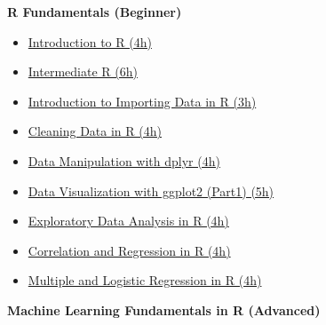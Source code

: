 \documentclass[
  11pt,
]{book}
\providecommand{\tightlist}{%
  \setlength{\itemsep}{0pt}\setlength{\parskip}{0pt}}
\newenvironment{tips}[1]
  {
  \begin{itemize}
  \footnotesize
  \renewcommand{\labelitemi}{
    \raisebox{-.7\height}[0pt][0pt]{
      {\setkeys{Gin}{width=3em,keepaspectratio}
        \texttt{[image: images/\#1.png]}}
    }
  }
  \setlength{\fboxsep}{1em}
  \begin{rbox}
  \item
  }
  {
  \end{rbox}
  \end{itemize}
  }
\begin{document}
\begin{tips}r

\textbf{R Fundamentals (Beginner)}

\begin{itemize}
\tightlist
\item
  \href{https://www.datacamp.com/courses/free-introduction-to-r}{Introduction to R (4h)}
\item
  \href{https://www.datacamp.com/courses/intermediate-r}{Intermediate R (6h)}
\item
  \href{https://www.datacamp.com/courses/importing-data-in-r-part-1}{Introduction to Importing Data in R (3h)}
\item
  \href{https://www.datacamp.com/courses/cleaning-data-in-r}{Cleaning Data in R (4h)}
\item
  \href{https://www.datacamp.com/courses/data-manipulation-with-dplyr-in-r}{Data Manipulation with dplyr (4h)}
\item
  \href{https://www.datacamp.com/courses/data-visualization-with-ggplot2-1}{Data Visualization with ggplot2 (Part1) (5h)}
\item
  \href{https://www.datacamp.com/courses/exploratory-data-analysis}{Exploratory Data Analysis in R (4h)}
\item
  \href{https://www.datacamp.com/courses/correlation-and-regression}{Correlation and Regression in R (4h)}
\item
  \href{https://www.datacamp.com/courses/multiple-and-logistic-regression}{Multiple and Logistic Regression in R (4h)}
\end{itemize}

\textbf{Machine Learning Fundamentals in R (Advanced)}


\end{tips}
\end{document}
